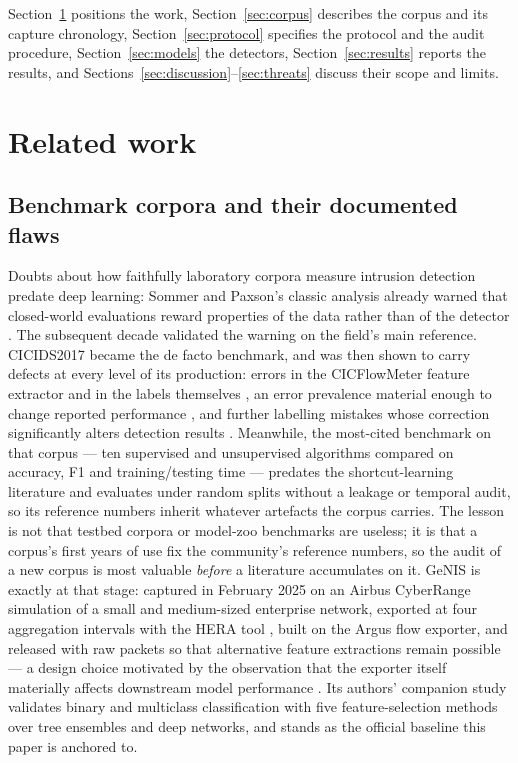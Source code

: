 \documentclass[review,12pt]{elsarticle}
\begin{document}
Section~\ref{sec:related} positions the work, Section~\ref{sec:corpus} describes the
corpus and its capture chronology, Section~\ref{sec:protocol} specifies the protocol and
the audit procedure, Section~\ref{sec:models} the detectors,
Section~\ref{sec:results} reports the results, and
Sections~\ref{sec:discussion}--\ref{sec:threats} discuss their scope and limits.

\section{Related work}
\label{sec:related}

\subsection{Benchmark corpora and their documented flaws}
Doubts about how faithfully laboratory corpora measure intrusion detection
predate deep learning: Sommer and Paxson's classic analysis already warned
that closed-world evaluations reward properties of the data rather than of
the detector \cite{sommer2010closed}. The subsequent decade validated the
warning on the field's main reference. CICIDS2017 \cite{sharafaldin2018cicids} became the de facto benchmark, and was then shown to carry defects at
every level of its production: errors in the CICFlowMeter feature extractor
and in the labels themselves \cite{engelen2021troubleshooting}, an error
prevalence material enough to change reported performance
\cite{liu2022error}, and further labelling mistakes whose correction
significantly alters detection results \cite{lanvin2022errors}. Meanwhile, the
most-cited benchmark on that corpus \cite{maseer2021benchmarking} ---
ten supervised and unsupervised algorithms compared on accuracy, F1 and
training/testing time --- predates the shortcut-learning literature and
evaluates under random splits without a leakage or temporal audit, so its
reference numbers inherit whatever artefacts the corpus carries. The lesson
is not that testbed corpora or model-zoo benchmarks are useless; it is that
a corpus's first years of use fix the community's reference numbers, so the
audit of a new corpus is most valuable \emph{before} a literature
accumulates on it. GeNIS
\cite{silva2025genis} is exactly at that stage: captured in February 2025 on
an Airbus CyberRange simulation of a small and medium-sized enterprise
network, exported at four aggregation intervals with the HERA tool
\cite{pinto2024hera}, built on the Argus flow exporter, and released with
raw packets so that alternative feature extractions remain possible --- a
design choice motivated by the observation that the exporter itself
materially affects downstream model performance \cite{pinto2025exporter}.
Its authors' companion study \cite{silva2025binary} validates binary and
multiclass classification with five feature-selection methods over tree
ensembles and deep networks, and stands as the official baseline this paper
is anchored to.
\end{document}
